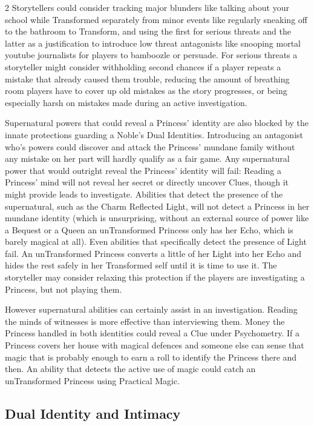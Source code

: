 \begin{multicols}{2}
Storytellers could consider tracking major blunders like talking about your school while Transformed separately from minor events like regularly sneaking off to the bathroom to Transform, and using the first for serious threats and the latter as a justification to introduce low threat antagonists like snooping mortal youtube journalists for players to bamboozle or persuade. For serious threats a storyteller might consider withholding second chances if a player repeats a mistake that already caused them trouble, reducing the amount of breathing room players have to cover up old mistakes as the story progresses, or being especially harsh on mistakes made during an active investigation. 

Supernatural powers that could reveal a Princess' identity are also blocked by the innate protections guarding a Noble's Dual Identities. Introducing an antagonist who's powers could discover and attack the Princess' mundane family without any mistake on her part will hardly qualify as a fair game. Any supernatural power that would outright reveal the Princess' identity will fail: Reading a Princess' mind will not reveal her secret or directly uncover Clues, though it might provide leads to investigate. Abilities that detect the presence of the supernatural, such as the Charm Reflected Light, will not detect a Princess in her mundane identity (which is unsurprising, without an external source of power like a Bequest or a Queen an unTransformed Princess only has her Echo, which is barely magical at all). Even abilities that specifically detect the presence of Light fail. An unTransformed Princess converts a little of her Light into her Echo and hides the rest safely in her Transformed self until it is time to 
use it. The storyteller may consider relaxing this protection if the players are investigating a Princess, but not playing them. 

However supernatural abilities can certainly assist in an investigation. Reading the minds of witnesses is more effective than interviewing them. Money the Princess handled in both identities could reveal a Clue under Psychometry. If a Princess covers her house with magical defences and someone else can sense that magic that is probably enough to earn a roll to identify the Princess there and then. An ability that detects the active use of magic could catch an unTransformed Princess using Practical Magic. 

\subsection*{Dual Identity and Intimacy}


\end{multicols}
